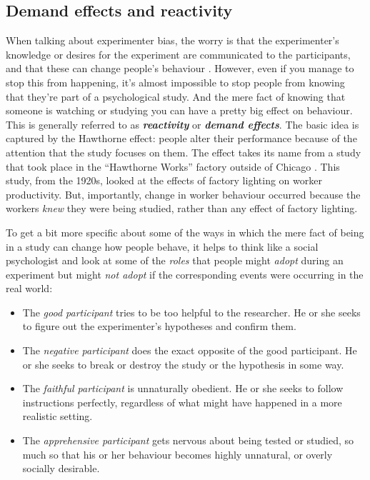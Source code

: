 \documentclass[
]{book}
\providecommand{\tightlist}{%
  \setlength{\itemsep}{0pt}\setlength{\parskip}{0pt}}
\begin{document}
\hypertarget{demand-effects-and-reactivity}{%
\subsection{Demand effects and reactivity}\label{demand-effects-and-reactivity}}

When talking about experimenter bias, the worry is that the experimenter's knowledge or desires for the experiment are communicated to the participants, and that these can change people's behaviour \citep{Rosenthal1966}. However, even if you manage to stop this from happening, it's almost impossible to stop people from knowing that they're part of a psychological study. And the mere fact of knowing that someone is watching or studying you can have a pretty big effect on behaviour. This is generally referred to as \textbf{\emph{reactivity}} or \textbf{\emph{demand effects}}. The basic idea is captured by the Hawthorne effect: people alter their performance because of the attention that the study focuses on them. The effect takes its name from a study that took place in the ``Hawthorne Works'' factory outside of Chicago \citep[see][]{Adair1984}. This study, from the 1920s, looked at the effects of factory lighting on worker productivity. But, importantly, change in worker behaviour occurred because the workers \emph{knew} they were being studied, rather than any effect of factory lighting.

To get a bit more specific about some of the ways in which the mere fact of being in a study can change how people behave, it helps to think like a social psychologist and look at some of the \emph{roles} that people might \emph{adopt} during an experiment but might \emph{not adopt} if the corresponding events were occurring in the real world:

\begin{itemize}
\tightlist
\item
  The \emph{good participant} tries to be too helpful to the researcher. He or she seeks to figure out the experimenter's hypotheses and confirm them.
\item
  The \emph{negative participant} does the exact opposite of the good participant. He or she seeks to break or destroy the study or the hypothesis in some way.
\item
  The \emph{faithful participant} is unnaturally obedient. He or she seeks to follow instructions perfectly, regardless of what might have happened in a more realistic setting.
\item
  The \emph{apprehensive participant} gets nervous about being tested or studied, so much so that his or her behaviour becomes highly unnatural, or overly socially desirable.
\end{itemize}
\end{document}
